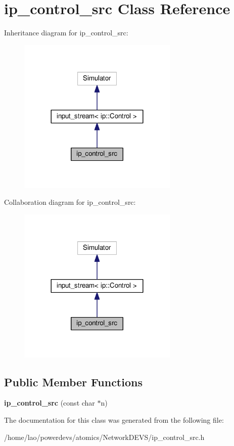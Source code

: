 \hypertarget{classip__control__src}{}\section{ip\+\_\+control\+\_\+src Class Reference}
\label{classip__control__src}


Inheritance diagram for ip\+\_\+control\+\_\+src\+:
\nopagebreak
\begin{figure}[H]
\begin{center}
\leavevmode
\includegraphics[width=216pt]{classip__control__src__inherit__graph}
\end{center}
\end{figure}


Collaboration diagram for ip\+\_\+control\+\_\+src\+:
\nopagebreak
\begin{figure}[H]
\begin{center}
\leavevmode
\includegraphics[width=216pt]{classip__control__src__coll__graph}
\end{center}
\end{figure}
\subsection*{Public Member Functions}
\begin{DoxyCompactItemize}
\item 
{\bfseries ip\+\_\+control\+\_\+src} (const char $\ast$n)\hypertarget{classip__control__src_a6046f82b5fd050f6ae6f24910f4a2a3c}{}\label{classip__control__src_a6046f82b5fd050f6ae6f24910f4a2a3c}

\end{DoxyCompactItemize}


The documentation for this class was generated from the following file\+:\begin{DoxyCompactItemize}
\item 
/home/lao/powerdevs/atomics/\+Network\+D\+E\+V\+S/ip\+\_\+control\+\_\+src.\+h\end{DoxyCompactItemize}
